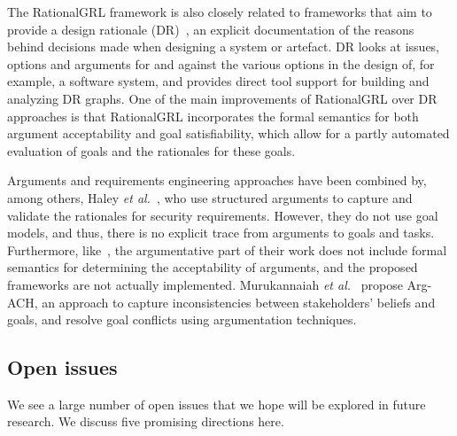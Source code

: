 The RationalGRL framework is also closely related to frameworks that aim to provide a design rationale (DR)~\cite{shum2006hypermedia}, an explicit documentation of the reasons behind decisions made when designing a system or artefact. DR looks at issues, options and arguments for and against the various options in the design of, for example, a software system, and provides direct tool support for building and analyzing DR graphs. One of the main improvements of RationalGRL over DR approaches is that RationalGRL incorporates the formal semantics for both argument acceptability and goal satisfiability, which allow for a partly automated evaluation of goals and the rationales for these goals. 

Arguments and requirements engineering approaches have been combined by, among others, Haley \emph{et al.}~\cite{haley2005arguing}, who use structured arguments to capture and validate the rationales for security requirements. However, they do not use goal models, and thus, there is no explicit trace from arguments to goals and tasks. Furthermore, like~\cite{Jureta:RE2008}, the argumentative part of their work does not include formal semantics for determining the acceptability of arguments, and the proposed frameworks are not actually implemented. Murukannaiah \emph{et al.}~\cite{murukannaiah2015resolving} propose Arg-ACH, an approach to capture inconsistencies between stakeholders' beliefs and goals, and resolve goal conflicts using argumentation techniques.

\subsection{Open issues}
\label{sect:goalmodeling:openissues}

We see a large number of open issues that we hope will be explored in future research. We discuss five promising directions here.

